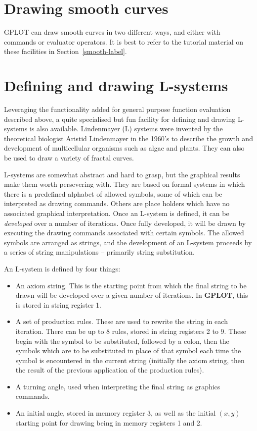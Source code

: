 \documentclass[a4paper,twoside,11pt]{article}
\newcommand{\newpara}{\par\vspace{4mm}\noindent}
\begin{document}
\section{Drawing smooth curves}
GPLOT can draw smooth curves in two different ways, and either with commands or evaluator operators. It is best to
refer to the tutorial material on these facilities in Section~\ref{smooth-label}.

\section{Defining and drawing L-systems}
Leveraging the functionality added for general purpose function evaluation described above, a quite specialised but
fun facility for defining and drawing L-systems is also available. Lindenmayer (L) systems were invented by the theoretical
biologist Aristid Lindenmayer in the 1960's to describe the growth and development of multicellular organisms such as 
algae and plants. They can also be used to draw a variety of fractal curves.
\newpara
L-systems are somewhat abstract and hard to grasp, but the graphical results make them worth persevering with.
They are based on formal systems in which there is a predefined alphabet of allowed symbols, some of which can
be interpreted as drawing commands. Others are place holders which have no associated graphical interpretation.
Once an L-system is defined, it can be \emph{developed} over a number of iterations. Once fully developed, it
will be drawn by executing the drawing commands associated with certain symbols. 
The allowed symbols are arranged as strings, and the development of an L-system proceeds by a series of
string manipulations -- primarily string substitution.
\newpara
An L-system is defined by four things:
\begin{itemize}
\item An axiom string. This is the starting point from which the final string to be drawn will be developed over a given
	number of iterations. In \textbf{GPLOT}, this is stored in string register 1.
\item A set of production rules. These are used to rewrite the string in each iteration. There can be up to 8 rules,
	stored in string registers 2 to 9. These begin with the symbol to be substituted, followed by a colon, then the
	symbols which are to be substituted in place of that symbol each time the symbol is encountered in the current
	string (initially the axiom string, then the result of the previous application of the production rules).
\item A turning angle, used when interpreting the final string as graphics commands.
\item An initial angle, stored in memory register 3, as well as
	the initial $(x,y)$ starting point for drawing being in memory registers 1 and 2.
\end{itemize}
\end{document}
